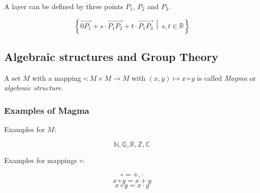 \documentclass[a4paper,landscape,twocolumn]{article}
\newcommand\setdef[2]{\left\{#1\,\middle|\,#2\right\}}
\begin{document}
A layer can be defined by three points $P_1$, $P_2$ and $P_3$.

\[ \setdef{\overrightarrow{0P_1} + s \cdot \overrightarrow{P_1 P_2} + t \cdot \overrightarrow{P_1 P_3}}{s, t \in \mathbb{R}} \]

\subsection{Algebraic structures and Group Theory}

A set $M$ with a mapping $\circ: M \times M \rightarrow M$ with $(x, y) \mapsto x \circ y$
is called \emph{Magma} or \emph{algebraic structure}.

\subsubsection{Examples of Magma}

Examples for $M$:

\[ \mathbb{N}, \mathbb{Q}, \mathbb{R}, \mathbb{Z}, \mathbb{C} \]

Examples for mappings $\circ$:

\[ \circ = +, \cdot \]
\[ x \circ y = x + y \]
\[ x \circ y = x \cdot y \]
\end{document}
